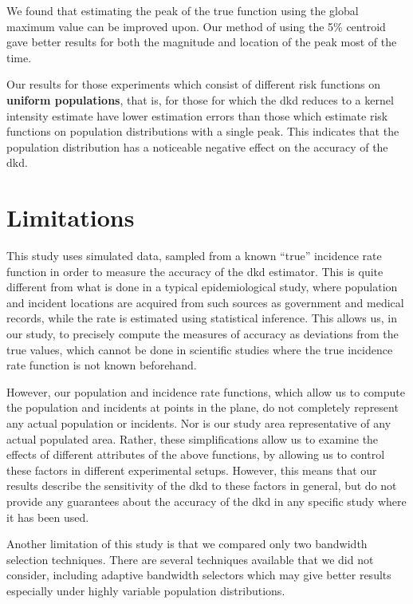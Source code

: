We found that estimating the peak of the true function using the global maximum value can be improved upon.
Our method of using the 5\% centroid gave better results for both the magnitude and location of the peak most of the time.

Our results for those experiments which consist of different \gls{risk} functions on
\textbf{uniform populations},
that is,
for those for which the \gls{dkd} reduces to a kernel intensity estimate
have lower estimation errors than those which estimate
\gls{risk} functions on population distributions with a single peak.
This indicates that the population distribution has a noticeable negative effect on the accuracy of the \gls{dkd}.

\section{Limitations}
\label{sec:discussion:limitations}

This study uses simulated data,
sampled from a known ``true'' incidence rate function in order to measure the accuracy of the \gls{dkd} estimator.
This is quite different from what is done in a typical epidemiological study,
where population and incident locations are acquired from such sources as government and medical records,
while the rate is estimated using statistical inference.
This allows us,
in our study,
to precisely compute the measures of accuracy as deviations from the true values,
which cannot be done in scientific studies where the true incidence rate function is not known beforehand.

However,
our population and incidence rate functions,
which allow us to compute the population and incidents at points in the plane,
do not completely represent any actual population or incidents.
Nor is our study area representative of any actual populated area.
Rather,
these simplifications allow us to examine the effects of different attributes of the above functions,
by allowing us to control these factors in different experimental setups.
However,
this means that our results describe the sensitivity of the \gls{dkd} to these factors in general,
but do not provide any guarantees about the accuracy of the \gls{dkd} in any specific study where it has been used.

Another limitation of this study is that we compared only two bandwidth selection techniques.
There are several techniques available that we did not consider,
including adaptive bandwidth selectors which may give better results especially under highly variable population distributions.

